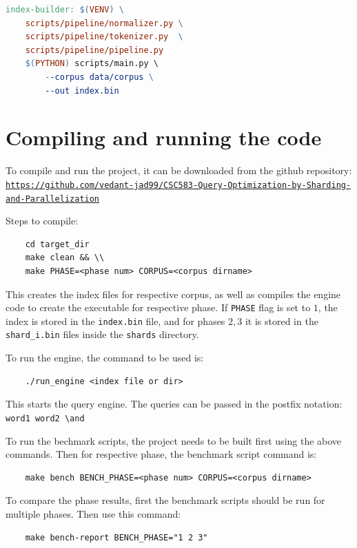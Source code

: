 \documentclass[twocolumn, 10pt]{article}
\begin{document}
\begin{lstlisting}[language=make, basicstyle=\ttfamily\scriptsize]
index-builder: $(VENV) \
    scripts/pipeline/normalizer.py \
    scripts/pipeline/tokenizer.py  \
    scripts/pipeline/pipeline.py
    $(PYTHON) scripts/main.py \
        --corpus data/corpus \
        --out index.bin
\end{lstlisting}

\section{Compiling and running the code}

To compile and run the project, it can be downloaded from the github repository:
\texttt{\url{https://github.com/vedant-jad99/CSC583-Query-Optimization-by-Sharding-and-Parallelization}}

Steps to compile:
\begin{verbatim}
	cd target_dir
	make clean && \\
	make PHASE=<phase num> CORPUS=<corpus dirname>
\end{verbatim}

This creates the index files for respective corpus, as well as compiles the engine code to create
the executable for respective phase. If \texttt{PHASE} flag is set to $1$, the index is
stored in the \texttt{index.bin} file, and for phases $2,3$ it is stored in the \texttt{shard\_i.bin}
files inside the \texttt{shards} directory.

To run the engine, the command to be used is:
\begin{verbatim}
	./run_engine <index file or dir>
\end{verbatim}

This starts the query engine. The queries can be passed in the postfix notation:
\texttt{word1 word2 \textbackslash and}

To run the bechmark scripts, the project needs to be built first using the above commands. Then
for respective phase, the benchmark script command is:

\begin{verbatim}
	make bench BENCH_PHASE=<phase num> CORPUS=<corpus dirname>
\end{verbatim}

To compare the phase results, first the benchmark scripts should be run for multiple phases. Then
use this command:

\begin{verbatim}
    make bench-report BENCH_PHASE="1 2 3"
\end{verbatim}

\end{document}
